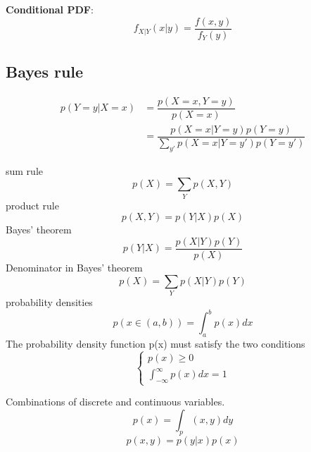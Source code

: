 \textbf{Conditional PDF}:
\begin{equation}
f_{X|Y}(x|y)=\dfrac{f(x,y)}{f_Y(y)}
\end{equation}

\subsection{Bayes rule}
\begin{equation}
\begin{split}
p(Y=y|X=x) & =\dfrac{p(X=x,Y=y)}{p(X=x)} \\
           & =\dfrac{p(X=x|Y=y)p(Y=y)}{\sum_{y'}p(X=x|Y=y')p(Y=y')}
\end{split}
\end{equation}

sum rule
\begin{equation}
                                  p(X) = \sum_{Y}p(X,Y)
\end{equation}
product rule
\begin{equation}
                                  p(X,Y) = p(Y|X)p(X)
\end{equation}
Bayes' theorem
\begin{equation}
                                  p(Y|X) = \frac{p(X|Y)p(Y)}{p(X)}
\end{equation}
Denominator in Bayes' theorem
\begin{equation}
                                  p(X) = \sum_Y{p(X|Y)p(Y)}
\end{equation}
probability densities
\begin{equation}
                         p(x\in (a,b)) = \int_{a}^{b}p(x)dx
\end{equation}
The probability density function p(x) must satisfy the two conditions
\begin{equation}
\begin{cases}
                                  p(x) \geq 0               \\
                                  \int_{-\infty}^{\infty}p(x)dx = 1
\end{cases}
\end{equation}

Combinations of discrete and continuous variables.
\begin{equation}
                                  p(x) = \int_p(x,y)dy	
\end{equation}
\begin{equation}
                                  p(x,y) = p(y|x)p(x)
\end{equation}


